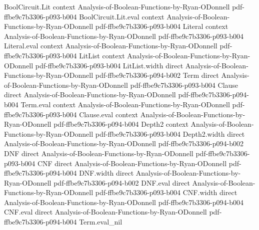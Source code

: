 \begin{theorem}
\label{DecisionTree.sparsity_le}
\leanok
{}
\proofstep
  {BoolCircuit.Lit}
  {context}
  {Analysis-of-Boolean-Functions-by-Ryan-ODonnell}
  {pdf-ffbe9c7b3306-p093-b004}
\proofstep
  {BoolCircuit.Lit.eval}
  {context}
  {Analysis-of-Boolean-Functions-by-Ryan-ODonnell}
  {pdf-ffbe9c7b3306-p093-b004}
\proofstep
  {Literal}
  {context}
  {Analysis-of-Boolean-Functions-by-Ryan-ODonnell}
  {pdf-ffbe9c7b3306-p093-b004}
\proofstep
  {Literal.eval}
  {context}
  {Analysis-of-Boolean-Functions-by-Ryan-ODonnell}
  {pdf-ffbe9c7b3306-p093-b004}
\proofstep
  {LitList}
  {context}
  {Analysis-of-Boolean-Functions-by-Ryan-ODonnell}
  {pdf-ffbe9c7b3306-p093-b004}
\proofstep
  {LitList.width}
  {direct}
  {Analysis-of-Boolean-Functions-by-Ryan-ODonnell}
  {pdf-ffbe9c7b3306-p094-b002}
\proofstep
  {Term}
  {direct}
  {Analysis-of-Boolean-Functions-by-Ryan-ODonnell}
  {pdf-ffbe9c7b3306-p093-b004}
\proofstep
  {Clause}
  {direct}
  {Analysis-of-Boolean-Functions-by-Ryan-ODonnell}
  {pdf-ffbe9c7b3306-p094-b004}
\proofstep
  {Term.eval}
  {context}
  {Analysis-of-Boolean-Functions-by-Ryan-ODonnell}
  {pdf-ffbe9c7b3306-p093-b004}
\proofstep
  {Clause.eval}
  {context}
  {Analysis-of-Boolean-Functions-by-Ryan-ODonnell}
  {pdf-ffbe9c7b3306-p094-b004}
\proofstep
  {Depth2}
  {context}
  {Analysis-of-Boolean-Functions-by-Ryan-ODonnell}
  {pdf-ffbe9c7b3306-p093-b004}
\proofstep
  {Depth2.width}
  {direct}
  {Analysis-of-Boolean-Functions-by-Ryan-ODonnell}
  {pdf-ffbe9c7b3306-p094-b002}
\proofstep
  {DNF}
  {direct}
  {Analysis-of-Boolean-Functions-by-Ryan-ODonnell}
  {pdf-ffbe9c7b3306-p093-b004}
\proofstep
  {CNF}
  {direct}
  {Analysis-of-Boolean-Functions-by-Ryan-ODonnell}
  {pdf-ffbe9c7b3306-p094-b004}
\proofstep
  {DNF.width}
  {direct}
  {Analysis-of-Boolean-Functions-by-Ryan-ODonnell}
  {pdf-ffbe9c7b3306-p094-b002}
\proofstep
  {DNF.eval}
  {direct}
  {Analysis-of-Boolean-Functions-by-Ryan-ODonnell}
  {pdf-ffbe9c7b3306-p093-b004}
\proofstep
  {CNF.width}
  {direct}
  {Analysis-of-Boolean-Functions-by-Ryan-ODonnell}
  {pdf-ffbe9c7b3306-p094-b004}
\proofstep
  {CNF.eval}
  {direct}
  {Analysis-of-Boolean-Functions-by-Ryan-ODonnell}
  {pdf-ffbe9c7b3306-p094-b004}
\proofstep
  {Term.eval_nil}

\end{theorem}
